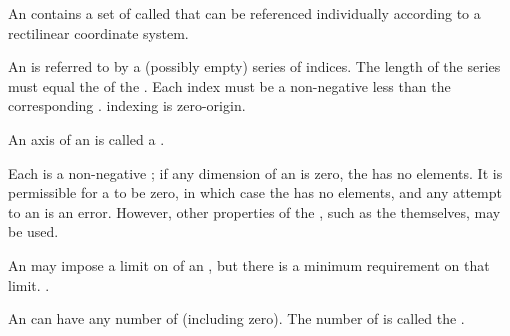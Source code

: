 

An  contains a set of  called 
that can be referenced individually according to a rectilinear coordinate system.


An   is referred to by a (possibly empty) series of indices.
The length of the series must equal the  of the .
Each index must be a non-negative  
less than the corresponding  .
 indexing is zero-origin.

\endsubsubsection%


An axis of an  is called a .

Each  is a non-negative 
;
 if any dimension of an  is zero, the  has no elements.
It is permissible for a  to be zero, 
in which case the  has no elements, 
and any attempt to  an 
is an error.  However, other properties of the ,  
such as the  themselves, may be used.


An  may impose a limit on  of an ,
but there is a minimum requirement on that limit.  .

\endsubsubsubsection%

\endsubsubsection%



An  can have any number of  (including zero).
The number of  is called the .

